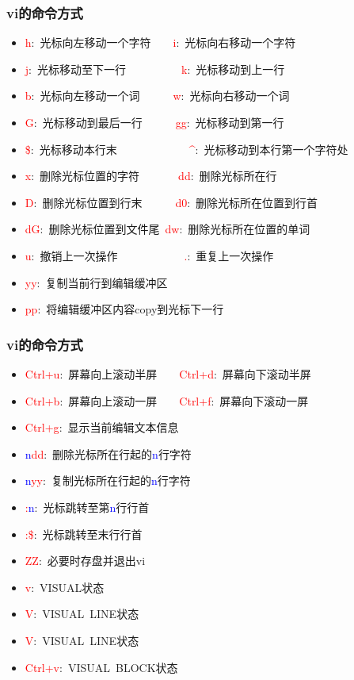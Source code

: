 \frame
{
	\frametitle{\textrm{vi}的命令方式}
	\begin{itemize}
		\item \textcolor{red}{h}:~光标向左移动一个字符~~~~\textcolor{red}{i}:~光标向右移动一个字符
		\item \textcolor{red}{j}:~光标移动至下一行~~~~~~~~~~\textcolor{red}{k}:~光标移动到上一行
		\item \textcolor{red}{b}:~光标向左移动一个词~~~~~~\textcolor{red}{w}:~光标向右移动一个词
		\item \textcolor{red}{G}:~光标移动到最后一行~~~~~~\textcolor{red}{gg}:~光标移动到第一行
		\item \textcolor{red}{\$}:~光标移动本行末~~~~~~~~~~~~~\textcolor{red}{\^{}}:~光标移动到本行第一个字符处
		\item \textcolor{red}{x}:~删除光标位置的字符~~~~~~~\textcolor{red}{dd}:~删除光标所在行
		\item \textcolor{red}{D}:~删除光标位置到行末~~~~~~\textcolor{red}{d0}:~删除光标所在位置到行首
		\item \textcolor{red}{dG}:~删除光标位置到文件尾~\textcolor{red}{dw}:~删除光标所在位置的单词
		\item \textcolor{red}{u}:~撤销上一次操作~~~~~~~~~~~~\textcolor{red}{.}:~重复上一次操作

		\item \textcolor{red}{yy}:~复制当前行到编辑缓冲区
		\item \textcolor{red}{pp}:~将编辑缓冲区内容\textrm{copy}到光标下一行
	\end{itemize}
}

\frame
{
	\frametitle{\textrm{vi}的命令方式}
	\begin{itemize}
		\item \textcolor{red}{Ctrl+u}:~屏幕向上滚动半屏~~~~\textcolor{red}{Ctrl+d}:~屏幕向下滚动半屏
		\item \textcolor{red}{Ctrl+b}:~屏幕向上滚动一屏~~~~\textcolor{red}{Ctrl+f}:~屏幕向下滚动一屏
		\item \textcolor{red}{Ctrl+g}:~显示当前编辑文本信息
		\item \textcolor{blue}{n}\textcolor{red}{dd}:~删除光标所在行起的\textcolor{blue}{n}行字符
		\item \textcolor{blue}{n}\textcolor{red}{yy}:~复制光标所在行起的\textcolor{blue}{n}行字符
		\item \textcolor{red}{:}\textcolor{blue}{n}:~光标跳转至第\textcolor{blue}{n}行行首
		\item \textcolor{red}{:\$}:~光标跳转至末行行首
		\item \textcolor{red}{ZZ}:~必要时存盘并退出\textrm{vi}
		\item \textcolor{red}{v}:~\textrm{VISUAL}状态
		\item \textcolor{red}{V}:~\textrm{VISUAL~LINE}状态
		\item \textcolor{red}{V}:~\textrm{VISUAL~LINE}状态
		\item \textcolor{red}{Ctrl+v}:~\textrm{VISUAL~BLOCK}状态
	\end{itemize}
}

